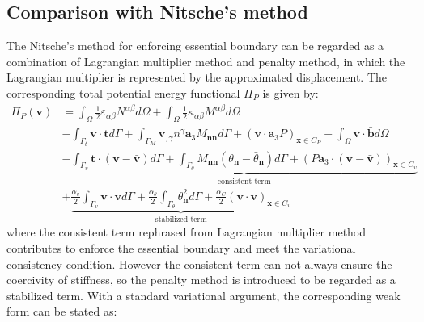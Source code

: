 \subsection{Comparison with Nitsche's method}
The Nitsche's method for enforcing essential boundary can be regarded as a combination of Lagrangian multiplier method and penalty method, in which the Lagrangian multiplier is represented by the approximated displacement. The corresponding total potential energy functional $\Pi_P$ is given by:
\begin{equation}
\begin{split}
\Pi_P(\boldsymbol v) &= \int_\Omega \frac{1}{2}\varepsilon_{\alpha\beta} N^{\alpha\beta} d\Omega +
\int_\Omega \frac{1}{2} \kappa_{\alpha\beta}M^{\alpha\beta} d\Omega \\
                     &- \int_{\Gamma_t} \boldsymbol v \cdot \bar{\boldsymbol t} d\Gamma 
                     + \int_{\Gamma_M} \boldsymbol v_{,\gamma} n^\gamma \boldsymbol a_3 M_{\boldsymbol{nn}} d\Gamma
                     + (\boldsymbol v \cdot \boldsymbol a_3 P)_{\boldsymbol x \in C_P}
                     - \int_\Omega \boldsymbol v \cdot \bar{\boldsymbol b} d\Omega \\
                     &- \underbrace{\int_{\Gamma_v} \boldsymbol t \cdot (\boldsymbol v - \bar{\boldsymbol v}) d\Gamma
                     + \int_{\Gamma_\theta} M_{\boldsymbol{nn}}(\theta_{\boldsymbol n} - \bar \theta_{\boldsymbol n})d\Gamma
                     + (P\boldsymbol a_3 \cdot (\boldsymbol v - \bar{\boldsymbol v}))_{\boldsymbol x \in C_v}}_{\text{consistent term}} \\
                     &+ \underbrace{\frac{\alpha_v}{2} \int_{\Gamma_v} \boldsymbol v \cdot \boldsymbol v d\Gamma 
                     + \frac{\alpha_\theta}{2} \int_{\Gamma_\theta} \theta_{\boldsymbol n}^2 d\Gamma
             + \frac{\alpha_C}{2}(\boldsymbol v \cdot \boldsymbol v)_{\boldsymbol x\in C_v}}_{\text{stabilized term}}
\end{split}
\end{equation}
where the consistent term rephrased from Lagrangian multiplier method contributes to enforce the essential boundary and meet the variational consistency condition. However the consistent term can not always ensure the coercivity of stiffness, so the penalty method is introduced to be regarded as a stabilized term. With a standard variational argument, the corresponding weak form can be stated as:

